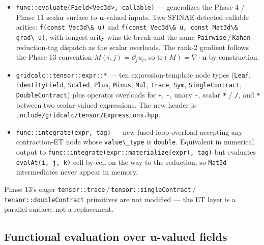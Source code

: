 \begin{itemize}
\tightlist
\item
  \passthrough{\lstinline!func::evaluate(Field<Vec3d>, callable)!} ---
  generalizes the Phase 4 / Phase 11 scalar surface to \(\mathbf
  u\)-valued inputs. Two SFINAE-detected callable arities:
  \passthrough{\lstinline!f(const Vec3d\& u)!} and
  \passthrough{\lstinline!f(const Vec3d\& u, const Mat3d\& grad\_u)!},
  with longest-arity-wins tie-break and the same
  \passthrough{\lstinline!Pairwise!}\,/\,\passthrough{\lstinline!Kahan!}
  reduction-tag dispatch as the scalar overloads. The rank-2 gradient
  follows the Phase 13 convention \(M(i, j) = \partial_j u_i\), so
  \(\mathrm{tr}(M) = \nabla\!\cdot\!\mathbf u\) by construction.
\item
  \passthrough{\lstinline!gridcalc::tensor::expr::*!} --- ten
  expression-template node types
  (\passthrough{\lstinline!Leaf!},
  \passthrough{\lstinline!IdentityField!},
  \passthrough{\lstinline!Scaled!},
  \passthrough{\lstinline!Plus!},
  \passthrough{\lstinline!Minus!},
  \passthrough{\lstinline!Mul!},
  \passthrough{\lstinline!Trace!},
  \passthrough{\lstinline!Sym!},
  \passthrough{\lstinline!SingleContract!},
  \passthrough{\lstinline!DoubleContract!}) plus operator overloads for
  \texttt{+}, \texttt{-}, unary \texttt{-}, scalar \texttt{*} / \texttt{/},
  and \texttt{*} between two scalar-valued expressions. The new header
  is \passthrough{\lstinline!include/gridcalc/tensor/Expressions.hpp!}.
\item
  \passthrough{\lstinline!func::integrate(expr, tag)!} --- new fused-loop
  overload accepting any contraction-ET node whose
  \passthrough{\lstinline!value\_type!} is \passthrough{\lstinline!double!}.
  Equivalent in numerical output to
  \passthrough{\lstinline!func::integrate(expr::materialize(expr), tag)!}
  but evaluates \passthrough{\lstinline!evalAt(i, j, k)!} cell-by-cell
  on the way to the reduction, so \passthrough{\lstinline!Mat3d!}
  intermediates never appear in memory.
\end{itemize}

Phase 13's eager
\passthrough{\lstinline!tensor::trace!}\,/\,\passthrough{\lstinline!tensor::singleContract!}\,/\,\passthrough{\lstinline!tensor::doubleContract!}
primitives are not modified --- the ET layer is a parallel surface, not
a replacement.

\subsection{Functional evaluation over \texorpdfstring{$\mathbf u$}{u}-valued fields}\label{phase15-evaluate}

